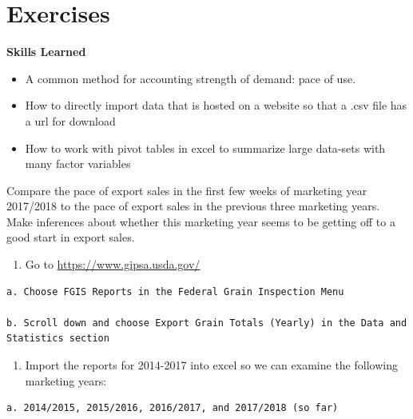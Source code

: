 \documentclass[
]{book}
\providecommand{\tightlist}{%
  \setlength{\itemsep}{0pt}\setlength{\parskip}{0pt}}
\begin{document}
\hypertarget{exercises-4}{%
\section{Exercises}\label{exercises-4}}

\textbf{Skills Learned}

\begin{itemize}
\item
  A common method for accounting strength of demand: pace of use.
\item
  How to directly import data that is hosted on a website so that a .csv file has a url for download
\item
  How to work with pivot tables in excel to summarize large data-sets with many factor variables
\end{itemize}

Compare the pace of export sales in the first few weeks of marketing year 2017/2018 to the pace of export sales in the previous three marketing years. Make inferences about whether this marketing year seems to be getting off to a good start in export sales.

\begin{enumerate}
\def\labelenumi{\arabic{enumi}.}
\tightlist
\item
  Go to \url{https://www.gipsa.usda.gov/}
\end{enumerate}

\begin{verbatim}
a. Choose FGIS Reports in the Federal Grain Inspection Menu  

b. Scroll down and choose Export Grain Totals (Yearly) in the Data and Statistics section  
\end{verbatim}

\begin{enumerate}
\def\labelenumi{\arabic{enumi}.}
\setcounter{enumi}{1}
\tightlist
\item
  Import the reports for 2014-2017 into excel so we can examine the following marketing years:
\end{enumerate}

\begin{verbatim}
a. 2014/2015, 2015/2016, 2016/2017, and 2017/2018 (so far)  
\end{verbatim}
\end{document}
